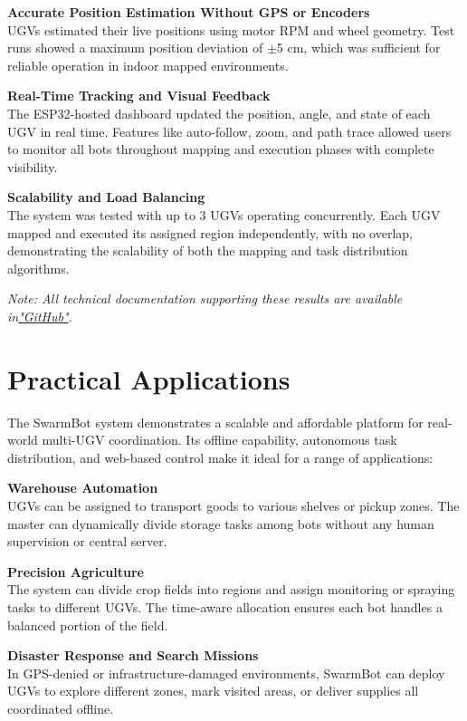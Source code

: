 \documentclass[a4paper,12pt]{report}
\begin{document}
\textbf{Accurate Position Estimation Without GPS or Encoders} \\
UGVs estimated their live positions using motor RPM and wheel geometry. Test runs showed a maximum position deviation of $\pm$5 cm, which was sufficient for reliable operation in indoor mapped environments.

\textbf{Real-Time Tracking and Visual Feedback} \\
The ESP32-hosted dashboard updated the position, angle, and state of each UGV in real time. Features like auto-follow, zoom, and path trace allowed users to monitor all bots throughout mapping and execution phases with complete visibility.

\textbf{Scalability and Load Balancing} \\
The system was tested with up to 3 UGVs operating concurrently. Each UGV mapped and executed its assigned region independently, with no overlap, demonstrating the scalability of both the mapping and task distribution algorithms.

\textit{Note: All technical documentation supporting these results are available in\href{https://github.com/sowmith12/SWARMBOTS/tree/main}{"GitHub"}.}


\chapter{Practical Applications}
The SwarmBot system demonstrates a scalable and affordable platform for real-world multi-UGV coordination. Its offline capability, autonomous task distribution, and web-based control make it ideal for a range of applications:

\vspace{0.5cm}
\textbf{Warehouse Automation} \\
UGVs can be assigned to transport goods to various shelves or pickup zones. The master can dynamically divide storage tasks among bots without any human supervision or central server.

\vspace{0.5cm}
\textbf{Precision Agriculture} \\
The system can divide crop fields into regions and assign monitoring or spraying tasks to different UGVs. The time-aware allocation ensures each bot handles a balanced portion of the field.

\vspace{0.5cm}
\textbf{Disaster Response and Search Missions} \\
In GPS-denied or infrastructure-damaged environments, SwarmBot can deploy UGVs to explore different zones, mark visited areas, or deliver supplies all coordinated offline.
\end{document}
